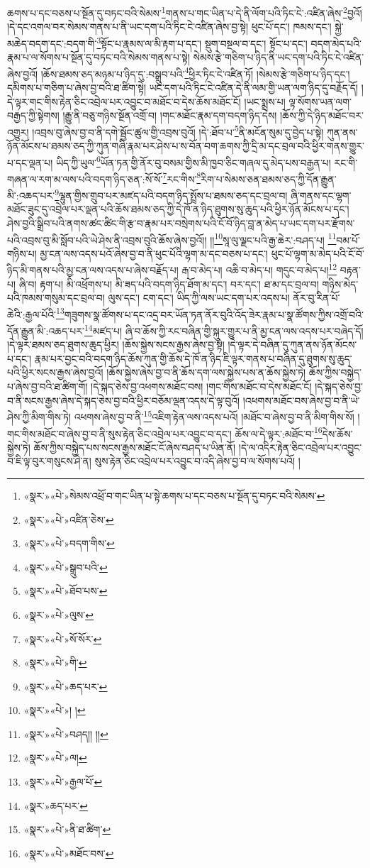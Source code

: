 ཆགས་པ་དང་བཅས་པ་སྔོན་དུ་བཏང་བའི་སེམས་\footnote{«སྣར་»«པེ་»སེམས་འཕྲོ་བ་གང་ཡིན་པ་སྟེ་ཆགས་པ་དང་བཅས་པ་སྔོན་དུ་བཏང་བའི་སེམས་}གནས་པ་གང་ཡིན་པ་དེ་ནི་ལོག་པའི་ཏིང་ངེ་:འཛིན་ཞེས་\footnote{«སྣར་»«པེ་»འཛིན་ཅེས་}བྱའོ། །དེ་དང་འགལ་བར་སེམས་གནས་པ་ནི་ཡང་དག་པའི་ཏིང་ངེ་འཛིན་ཞེས་བྱ་སྟེ། ཕུང་པོ་དང་། ཁམས་དང་། སྐྱེ་མཆེད་བདག་དང་:བདག་གི་\footnote{«སྣར་»«པེ་»བདག་གིས་}སྟོང་པ་རྣམས་ལ་མི་རྟག་པ་དང་། སྡུག་བསྔལ་བ་དང་། སྟོང་པ་དང་། བདག་མེད་པའི་རྣམ་པ་ལ་སོགས་པ་སྔོན་དུ་བཏང་བའི་སེམས་གནས་པ་སྟེ། སེམས་རྩེ་གཅིག་པ་ཉིད་ནི་ཡང་དག་པའི་ཏིང་ངེ་འཛིན་ཞེས་བྱའོ། །ཆོས་ཐམས་ཅད་མཉམ་པ་ཉིད་དུ་:བསྒྲུབ་པའི་\footnote{«སྣར་»«པེ་»སྒྲུབ་པའི་}ཕྱིར་ཏིང་ངེ་འཛིན་ཏོ། །སེམས་རྩེ་གཅིག་པ་ཉིད་དང་། དམིགས་པ་གཅིག་པ་ཞེས་བྱ་བའི་ཐ་ཚིག་སྟེ། ཡང་དག་པའི་ཏིང་ངེ་འཛིན་དེ་ནི་ལམ་གྱི་ཡན་ལག་ཉིད་དུ་བརྗོད་དོ། །དེ་ལྟར་གང་གིས་རྟེན་ཅིང་འབྲེལ་པར་འབྱུང་བ་མཐོང་བ་དེས་ཆོས་མཐོང་ངོ། །ཡང་སྨྲས་པ། ལྟ་སོགས་ཡན་ལག་བརྒྱད་ཀྱི་སྟེགས། །རྒྱུ་ནི་བཅུ་གཉིས་སྔོན་འགྲོ་བ། །གང་མཐོང་རྣམ་དག་བདག་ཉིད་དེས། །ཆོས་ཀྱི་དེ་ཉིད་མཐོང་བར་འགྱུར། །འབྲས་བུ་ཞེས་བྱ་བ་ནི་དགེ་སྦྱོང་ཚུལ་གྱི་འབྲས་བུའོ། །དེ་:ཐོབ་པ་\footnote{«སྣར་»«པེ་»ཐོབ་པས་}ནི་མངོན་སུམ་དུ་བྱེད་པ་སྟེ། ཀུན་ནས་ཉོན་མོངས་པ་ཐམས་ཅད་ཀྱི་ཀུན་གཞི་རྣམ་པར་ཤེས་པ་ས་བོན་བག་ཆགས་ཀྱི་དྲི་མ་དང་བྲལ་བའི་ཕྱིར་གནས་གྱུར་པ་དང་ལྡན་པ། ཡིད་ཀྱི་ཡུལ་\footnote{«སྣར་»«པེ་»ལུས་}ཡོན་ཏན་གྱི་ནོར་བུ་བསམ་གྱིས་མི་ཁྱབ་ཅིང་གཞལ་དུ་མེད་པས་བརྒྱན་པ། རང་གི་གཞན་ལ་རག་མ་ལས་པའི་བདག་ཉིད་ཅན་:སོ་སོ་\footnote{«སྣར་»«པེ་»སོ་སོར་}རང་གིས་\footnote{«སྣར་»«པེ་»གི་}རིག་པ་སེམས་ཅན་ཐམས་ཅད་ཀྱི་དོན་རྒྱུན་མི་:འཆད་པར་\footnote{«སྣར་»«པེ་»ཆད་པར་}ལྷུན་གྱིས་གྲུབ་པར་མཛད་པའི་བདག་ཉིད་སྤྲོས་པ་ཐམས་ཅད་དང་བྲལ་བ། ཞི་གནས་དང་ལྷག་མཐོང་ཟུང་དུ་འབྲེལ་པར་ལྡན་པའི་ཆོས་ཐམས་ཅད་ཀྱི་དེ་ཁོ་ན་ཉིད་ཐུགས་སུ་ཆུད་པའི་ཕྱིར་ཉོན་མོངས་པ་དང་། ཤེས་བྱའི་སྒྲིབ་པའི་ནགས་ཚང་ཚིང་གི་རྩ་བ་རྣམ་པར་བསྲེགས་པའི་ངོ་བོ་ཉིད་བླ་ན་མེད་པ་ཡང་དག་པར་རྫོགས་པའི་འབྲས་བུ་མི་སློབ་པའི་ཡེ་ཤེས་ནི་འབྲས་བུའི་ཆོས་ཞེས་བྱའོ།། །།\footnote{«སྣར་»«པེ་»། །}སཱ་ལུ་ལྗང་པའི་རྒྱ་ཆེར་:བཤད་པ། \footnote{«སྣར་»«པེ་»བཤད།། །། }བམ་པོ་གཉིས་པ། མྱ་ངན་ལས་འདས་པའོ་ཞེས་བྱ་བ་ནི་ཕུང་པོའི་ལྷག་མ་དང་བཅས་པ་དང་། ཕུང་པོ་ལྷག་མ་མེད་པའི་ངོ་བོ་ཉིད་མི་གནས་པའི་མྱ་ངན་ལས་འདས་པ་ཞེས་བརྗོད་པ། རྒ་བ་མེད་པ། འཆི་བ་མེད་པ། གདུང་བ་མེད་པ།\footnote{«སྣར་»«པེ་»ལ།} བརྟན་པ། ཞི་བ། རྟག་པ། མི་འཕྲོགས་པ། མི་ཟད་པའི་བདག་ཉིད་ཐོག་མ་དང་། བར་དང་། ཐ་མ་དང་བྲལ་བ། གཉིས་མེད་པའི་ཁམས་གསུམ་དང་བྲལ་བ། ལུས་དང་། ངག་དང་། ཡིད་ཀྱི་ལས་ཡང་དག་པར་འདས་པ། ནོར་བུ་རིན་པོ་ཆེའི་:རྒྱལ་པོའི་\footnote{«སྣར་»«པེ་»རྒྱལ་པོ་}གཟུགས་སྣ་ཚོགས་པ་དང་འདྲ་བར་ཡོན་ཏན་ནོར་བུའི་འོད་ཟེར་རྣམ་པ་སྣ་ཚོགས་ཀྱིས་འགྲོ་བའི་དོན་རྒྱུན་མི་:འཆད་པར་\footnote{«སྣར་»ཆད་པར་}མཛད་པ། ཞི་བ་ཆོས་ཀྱི་རང་བཞིན་གྱི་སྐུར་གྱུར་པ་ནི་མྱ་ངན་ལས་འདས་པར་བཞེད་དོ། །དེ་ལྟར་ཐམས་ཅད་ཐུགས་ཆུད་ཕྱིར། །ཆོས་སྐྱེས་སངས་རྒྱས་ཞེས་བྱ་སྟེ། །དེ་ལྟར་དེ་བཞིན་དུ་ཀུན་ནས་ཉོན་མོངས་པ་དང་། རྣམ་པར་བྱང་བའི་བདག་ཉིད་ཆོས་ཀུན་གྱི་ཆོས་དེ་ཁོ་ན་ཉིད་ཇི་ལྟར་གནས་པ་བཞིན་དུ་ཐུགས་སུ་ཆུད་པའི་ཕྱིར་སངས་རྒྱས་ཞེས་བྱའོ། །ཆོས་སྐྱེས་ཞེས་བྱ་བ་ནི་ཆོས་དག་ལས་སྐྱེས་པས་ན་ཆོས་སྐྱེས་ཏེ། ཆོས་ཀྱིས་བསྐྱེད་པ་ཞེས་བྱ་བའི་ཐ་ཚིག་གོ། །དེ་སྐད་ཅེས་བྱ་འཕགས་མཐོང་བས། །གང་གིས་མཐོང་བ་དེས་མཐོང་ངོ། །དེ་སྐད་ཅེས་བྱ་བ་ནི་སངས་རྒྱས་ཞེས་དེ་སྐད་ཅེས་བྱ་བའི་ཕྱིར་བཅོམ་ལྡན་འདས་དེ་ལྟ་བུའོ། །འཕགས་མཐོང་བས་ཞེས་བྱ་བ་ནི་ཡེ་ཤེས་ཀྱི་མིག་གིས་ཏེ། འཕགས་ཞེས་བྱ་བ་ནི་\footnote{«སྣར་»«པེ་»ནི་ཐ་ཚིག་}འཇིག་རྟེན་ལས་འདས་པའོ། །མཐོང་བ་ཞེས་བྱ་བ་ནི་མིག་གིས་སོ། །གང་གིས་མཐོང་བ་ཞེས་བྱ་བ་ནི་སུས་རྟེན་ཅིང་འབྲེལ་པར་འབྱུང་བ་དང་། ཆོས་ལ་དེ་ལྟར་:མཐོང་བ་\footnote{«སྣར་»«པེ་»མཐོང་བས་}དེས་ཆོས་སྐྱེས་ཏེ། ཆོས་ཀྱིས་བསྐྱེད་པས་སངས་རྒྱས་མཐོང་ངོ་ཞེས་བཤད་པ་ཡིན་ནོ། །དེ་ལ་འདིར་རྟེན་ཅིང་འབྲེལ་པར་འབྱུང་བ་ཇི་ལྟ་བུར་གསུངས་ཤེ་ན། སུས་རྟེན་ཅིང་འབྲེལ་པར་འབྱུང་བ་འདི་ཞེས་བྱ་བ་ལ་སོགས་པའོ། །
